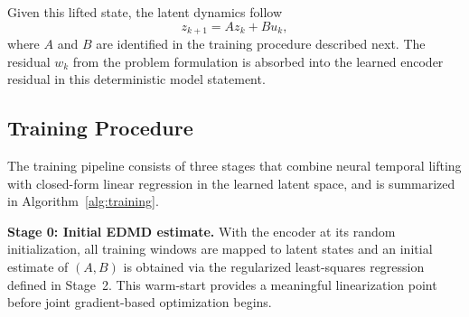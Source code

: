 \documentclass[journal]{IEEEtran}
\begin{document}
Given this lifted state, the latent dynamics follow
\begin{equation}
    z_{k+1} = A z_k + B u_k,
    \label{eq:temporal_dynamics}
\end{equation}
where $A$ and $B$ are identified in the training procedure described next. The residual $w_k$ from the problem formulation is absorbed into the learned encoder residual in this deterministic model statement.

\subsection{Training Procedure}
\label{sec:training}

The training pipeline consists of three stages that combine neural temporal lifting with closed-form linear regression in the learned latent space, and is summarized in Algorithm~\ref{alg:training}.

\textbf{Stage 0: Initial EDMD estimate.}
With the encoder at its random initialization, all training windows are mapped to latent states and an initial estimate of $(A,B)$ is obtained via the regularized least-squares regression defined in Stage~2. This warm-start provides a meaningful linearization point before joint gradient-based optimization begins.
\end{document}
